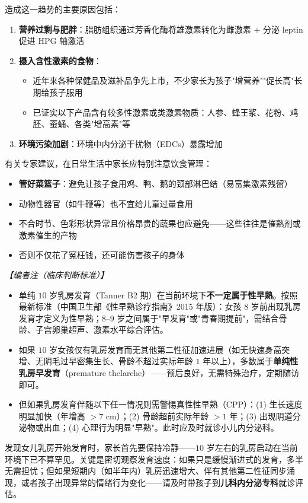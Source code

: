 \begin{enumerate}
造成这一趋势的主要原因包括：
\begin{enumerate}
	\item \textbf{营养过剩与肥胖}：脂肪组织通过芳香化酶将雄激素转化为雌激素 + 分泌 leptin 促进 HPG 轴激活
	\item \textbf{摄入含性激素的食物}：
	\begin{itemize}
		\item 近年来各种保健品及滋补品争先上市，不少家长为孩子"增营养""促长高"长期给孩子服用
		\item 已证实以下产品含有较多性激素或类激素物质：人参、蜂王浆、花粉、鸡胚、蚕蛹、各类"增高素"等
	\end{itemize}
	\item \textbf{环境污染加剧}：环境中内分泌干扰物（EDCs）暴露增加
\end{enumerate}

有关专家建议，在日常生活中家长应特别注意饮食管理：
\begin{itemize}
	\item \textbf{管好菜篮子}：避免让孩子食用鸡、鸭、鹅的颈部淋巴结（易富集激素残留）
	\item 动物性器官（如牛鞭等）也不宜给儿童过量食用
	\item 不合时节、色彩形状异常且价格昂贵的蔬果也应避免——这些往往是催熟剂或激素催生的产物
	\item 否则不仅花了冤枉钱，还可能伤害孩子的身体
\end{itemize}

\vspace{0.5em}
\noindent\textit{【编者注（临床判断标准）】}
\begin{itemize}
	\item 单纯 $10$ 岁乳房发育（Tanner B2 期）在当前环境下\textbf{不一定属于性早熟}。按照最新标准（中国卫生部《性早熟诊疗指南》2015 年版）：女孩 $8$ 岁前出现乳房发育才定义为性早熟；$8$--$9$ 岁之间属于"早发育"或"青春期提前"，需结合骨龄、子宫卵巢超声、激素水平综合评估。
	\item 如果 $10$ 岁女孩仅有乳房发育而无其他第二性征加速进展（如无快速身高突增、无阴毛过早密集生长、骨龄不超过实际年龄 $1$ 年以上），多数属于\textbf{单纯性乳房早发育}（premature thelarche）——预后良好，无需特殊治疗，定期随访即可。
	\item 但如果乳房发育伴随以下任一情况则需警惕真性性早熟（CPP）：(1) 生长速度明显加快（年增高 $>7$ cm）；(2) 骨龄超前实际年龄 $>1$ 年；(3) 出现阴道分泌物或出血；(4) 心理行为明显"早熟"。此时应及时就诊小儿内分泌科。
\end{itemize}

\begin{tcolorbox}[colback=pink!5!white,colframe=red!50!black,title=贴心小叮咛]
发现女儿乳房开始发育时，家长首先要保持冷静——$10$ 岁左右的乳房启动在当前环境下已不算罕见。关键是密切观察发育速度：如果只是缓慢渐进式的发育，多半无需担忧；但如果短期内（如半年内）乳房迅速增大、伴有其他第二性征同步涌现，或者孩子出现异常的情绪行为变化——请及时带孩子到\textbf{儿科内分泌专科}就诊评估。
\end{tcolorbox}


\end{enumerate}
